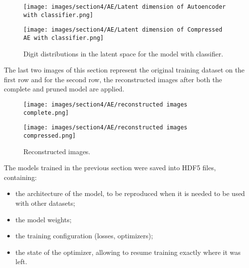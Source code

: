 \documentclass{article}
\begin{document}
\begin{figure}[H]
  \centering
  \begin{minipage}[c]{.4\textwidth}
   {\texttt{[image: images/section4/AE/Latent dimension of Autoencoder with classifier.png]}}
    \end{minipage}
    \qquad \qquad
      \begin{minipage}[c]{0.4\textwidth}
  {\texttt{[image: images/section4/AE/Latent dimension of Compressed AE with classifier.png]}}
     \end{minipage}
     \quad   
   \caption{Digit distributions in the latent space for the model with classifier.}
    \label{fig:latent}
\end{figure}

The last two images of this section represent the original training dataset on the first row and 
for the second row, the reconstructed images after both the complete and pruned model are applied.

\begin{figure}[H]
  \centering
  \begin{minipage}[c]{.4\textwidth}
   {\texttt{[image: images/section4/AE/reconstructed images complete.png]}}
    \end{minipage}
    \qquad \qquad
      \begin{minipage}[c]{0.4\textwidth}
  {\texttt{[image: images/section4/AE/reconstructed images compressed.png]}}
     \end{minipage}
     \quad   
   \caption{Reconstructed images.}
    \label{fig:reco}
\end{figure}

\par The models trained in the previous section were saved into HDF5 files, containing:
\begin{itemize}
  \item the architecture of the model, to be reproduced when it is needed to be used with other datasets;
  \item the model weights;
  \item the training configuration (losses, optimizers);
  \item the state of the optimizer, allowing to resume training exactly where it was left.
\end{itemize}

\end{document}
